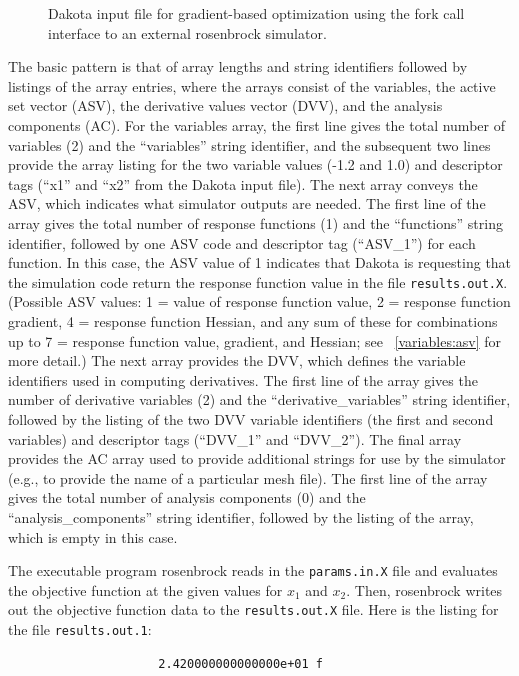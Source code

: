 \begin{figure}[b!]
  \begin{bigbox}
    \begin{small}
    \end{small}
  \end{bigbox}
  \caption{Dakota input file for gradient-based optimization using the
    fork call interface to an external rosenbrock simulator.}
  \label{tutorial:rosenbrock_user}
\end{figure}

The basic pattern is that of array lengths and string identifiers
followed by listings of the array entries, where the arrays consist of
the variables, the active set vector (ASV), the derivative values
vector (DVV), and the analysis components (AC). For the variables
array, the first line gives the total number of variables (2) and the
``variables'' string identifier, and the subsequent two lines provide
the array listing for the two variable values (-1.2 and 1.0) and
descriptor tags (``x1'' and ``x2'' from the Dakota input file). The
next array conveys the ASV, which indicates what
simulator outputs are needed. The first line of the array gives the total number
of response functions (1) and the ``functions'' string identifier,
followed by one ASV code and descriptor tag
(``ASV\_1'') for each function. In this case, the ASV value of 1 indicates that Dakota
is requesting that the simulation code return the response function
value in the file \texttt{results.out.X}. (Possible ASV values: 1 = value of
response function value, 2 = response function gradient, 4 = response
function Hessian, and any sum of these for combinations up to
7 = response function value, gradient, and Hessian; see ~\ref{variables:asv} for
more detail.)  The next array provides the DVV, which defines the
variable identifiers used in computing derivatives. The first line of
the array gives the number of derivative variables (2) and the
``derivative\_variables'' string identifier, followed by the listing of
the two DVV variable identifiers (the first and second variables) and
descriptor tags (``DVV\_1'' and ``DVV\_2''). The final array provides
the AC array used to provide additional strings for use by the
simulator (e.g., to provide the name of a particular mesh file). The
first line of the array gives the total number of analysis components
(0) and the ``analysis\_components'' string identifier, followed by the
listing of the array, which is empty in this case.

The executable program rosenbrock reads in the \texttt{params.in.X}
file and evaluates the objective function at the given values for
$x_1$ and $x_2$. Then, rosenbrock writes out
the objective function data to the \texttt{results.out.X} file. Here
is the listing for the file \texttt{results.out.1}:
\begin{small}
\begin{verbatim}
                     2.420000000000000e+01 f
\end{verbatim}
\end{small}

